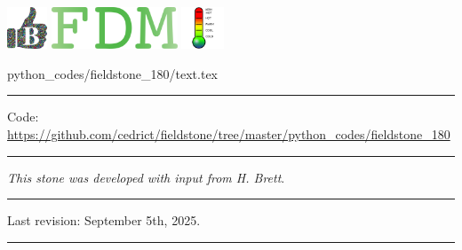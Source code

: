\noindent
\includegraphics[height=1.25cm]{images/pictograms/benchmark}
\includegraphics[height=1.25cm]{images/pictograms/FDM}
\includegraphics[height=1.25cm]{images/pictograms/temperature}


\begin{flushright} {\tiny {\color{gray} python\_codes/fieldstone\_180/text.tex}} \end{flushright}

%

\par\noindent\rule{\textwidth}{0.4pt}

\begin{center}
\inpython
{\small Code: \url{https://github.com/cedrict/fieldstone/tree/master/python_codes/fieldstone_180}}
\end{center}

\par\noindent\rule{\textwidth}{0.4pt}

{\sl This stone was developed with input from H. Brett}. 

\par\noindent\rule{\textwidth}{0.4pt}

Last revision: September 5th, 2025.

\par\noindent\rule{\textwidth}{0.4pt}


